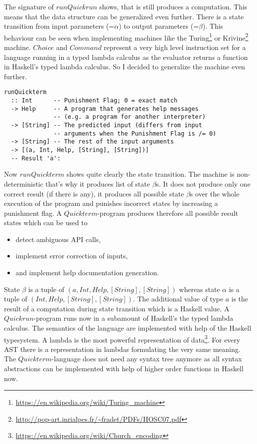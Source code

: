 \documentclass[a4paper]{article}
\begin{document}
The signature of $runQuickrun$ shows, that is still produces a computation. This means that the data structure can be generalized even further. There is a state transition from input parameters (=$\alpha$) to output parameters (=$\beta$). This behaviour can be seen when implementing machines like the Turing\footnote{\url{https://en.wikipedia.org/wiki/Turing_machine}} or Krivine\footnote{\url{http://pop-art.inrialpes.fr/~fradet/PDFs/HOSC07.pdf}} machine. $Choice$ and $Command$ represent a very high level instruction set for a language running in a typed lambda calculus as the evaluator returns a function in Haskell's typed lambda calculus. So I decided to generalize the machine even further.

\begin{lstlisting}
runQuickterm
  :: Int      -- Punishment Flag; 0 = exact match
  -> Help     -- A program that generates help messages
              -- (e.g. a program for another interpreter)
  -> [String] -- The predicted input (differs from input
              -- arguments when the Punishment Flag is /= 0)
  -> [String] -- The rest of the input arguments
  -> [(a, Int, Help, [String], [String])]
  -- Result 'a': 
\end{lstlisting}

Now $runQuickterm$ shows quite clearly the state transition. The machine is non-deterministic that's why it produces list of state $\beta$s. It does not produce only one correct result (if there is any), it produces all possible state $\beta$s over the whole execution of the program and punishes incorrect states by increasing a punishment flag. A $Quickterm$-program produces therefore all possible result states which can be used to
\begin{itemize}
\item detect ambiguous API calls,
\item implement error correction of inputs,
\item and implement help documentation generation.
\end{itemize}

State $\beta$ is a tuple of $(a,Int,Help,[String],[String])$ whereas state $\alpha$ is a tuple of $(Int,Help,[String],[String])$. The additional value of type $a$ is the result of a computation during state transition which is a Haskell value. A $Quickrun$-program runs now in a subamount of Haskell's the typed lambda calculus. The semantics of the language are implemented with help of the Haskell typesystem. A lambda is the most powerful representation of data\footnote{\url{https://en.wikipedia.org/wiki/Church_encoding}}. For every AST there is a representation in lambdas formulating the very same meaning. The $Quickterm$-language does not need any syntax tree anymore as all syntax abstractions can be implemented with help of higher order functions in Haskell now.
\end{document}
